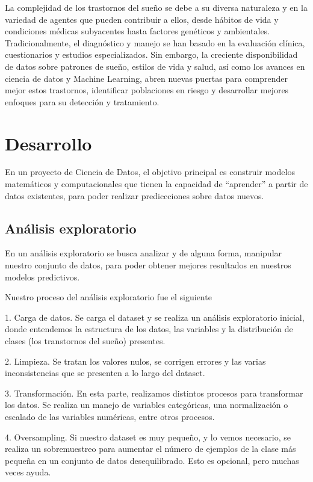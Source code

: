 \documentclass{replab}
\begin{document}
La complejidad de los trastornos del sueño se debe a su diversa naturaleza y en la variedad de agentes que pueden contribuir a ellos, desde hábitos de vida y condiciones médicas subyacentes hasta factores genéticos y ambientales. Tradicionalmente, el diagnóstico y manejo se han basado en la evaluación clínica, cuestionarios y estudios especializados. Sin embargo, la creciente disponibilidad de datos sobre patrones de sueño, estilos de vida y salud, así como los avances en ciencia de datos y Machine Learning, abren nuevas puertas para comprender mejor estos trastornos, identificar poblaciones en riesgo y desarrollar mejores enfoques para su detección y tratamiento.

	\section{Desarrollo}

En un proyecto de Ciencia de Datos, el objetivo principal es construir modelos matemáticos y computacionales que tienen la capacidad de ``aprender'' a partir de datos existentes, para poder realizar prediccciones sobre datos nuevos.

    \subsection{Análisis exploratorio}

En un análisis exploratorio se busca analizar y de alguna forma, manipular nuestro conjunto de datos, para poder obtener mejores resultados en nuestros modelos predictivos.

Nuestro proceso del análisis exploratorio fue el siguiente

1. Carga de datos. Se carga el dataset y se realiza un análisis exploratorio inicial, donde entendemos la estructura de los datos, las variables y la distribución de clases (los transtornos del sueño) presentes.

2. Limpieza. Se tratan los valores nulos, se corrigen errores y las varias inconsistencias que se presenten a lo largo del dataset.

3. Transformación. En esta parte, realizamos distintos procesos para transformar los datos. Se realiza un manejo de variables categóricas, una normalización o escalado de las variables numéricas, entre otros procesos.

4. Oversampling. Si nuestro dataset es muy pequeño, y lo vemos necesario, se realiza un sobremuestreo para aumentar el número de ejemplos de la clase más pequeña en un conjunto de datos desequilibrado. Esto es opcional, pero muchas veces ayuda.
\end{document}
